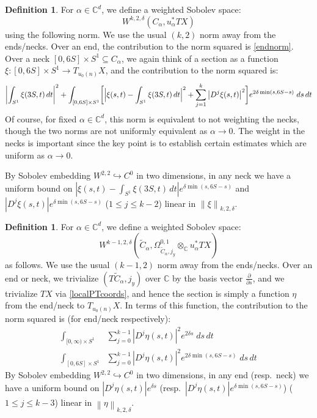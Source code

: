 \documentclass[12pt]{article}
\theoremstyle{definition}
\newtheorem{definition}[theorem]{Definition}
\theoremstyle{remark}
\numberwithin{equation}{subsection}
\newcommand{\CC}{\mathbb C}
\begin{document}
\begin{definition}
For $\alpha\in\CC^d$, we define a weighted Sobolev space:
\begin{equation}
W^{k,2,\delta}(C_\alpha,u_\alpha^\ast TX)
\end{equation}
using the following norm.  We use the usual $(k,2)$ norm away from the ends/necks.  Over an end, the contribution to the norm squared is \eqref{endnorm}.  Over a neck $[0,6S]\times S^1\subseteq C_\alpha$, we again think of a section as a function $\xi:[0,6S]\times S^1\to T_{u_0(n)}X$, and the contribution to the norm squared is:
\begin{equation*}
\biggl|\int_{S^1}\xi(3S,t)\,dt\biggr|^2+\int_{[0,6S]\times S^1}\biggl[\Bigl|\xi(s,t)-\int_{S^1}\xi(3S,t)\,dt\Bigr|^2+\sum_{j=1}^k\left|D^j\xi(s,t)\right|^2\biggr]e^{2\delta\min(s,6S-s)}\;ds\,dt
\end{equation*}
Of course, for fixed $\alpha\in\CC^d$, this norm is equivalent to not weighting the necks, though the two norms are not uniformly equivalent as $\alpha\to 0$.  The weight in the necks is important since the key point is to establish certain estimates which are uniform as $\alpha\to 0$.

By Sobolev embedding $W^{2,2}\hookrightarrow C^0$ in two dimensions, in any neck we have a uniform bound on $\left|\xi(s,t)-\int_{S^1}\xi(3S,t)\,dt\right|e^{\delta\min(s,6S-s)}$ and $\left|D^j\xi(s,t)\right|e^{\delta\min(s,6S-s)}$ ($1\leq j\leq k-2$) linear in $\left\|\xi\right\|_{k,2,\delta}$.
\end{definition}

\begin{definition}
For $\alpha\in\CC^d$, we define a weighted Sobolev space:
\begin{equation}
W^{k-1,2,\delta}(\tilde C_\alpha,\Omega^{0,1}_{\tilde C_\alpha,j_y}\otimes_\CC u_\alpha^\ast TX)
\end{equation}
as follows.  We use the usual $(k-1,2)$ norm away from the ends/necks.  Over an end or neck, we trivialize $(T\tilde C_\alpha,j_y)$ over $\CC$ by the basis vector $\frac\partial{\partial s}$, and we trivialize $TX$ via \eqref{localPTcoords}, and hence the section is simply a function $\eta$ from the end/neck to $T_{u_0(n)}X$.  In terms of this function, the contribution to the norm squared is (for end/neck respectively):
\begin{align}
\int_{[0,\infty)\times S^1}&\sum_{j=0}^{k-1}\left|D^j\eta(s,t)\right|^2e^{2\delta s}\;ds\,dt\\
\int_{[0,6S]\times S^1}&\sum_{j=0}^{k-1}\left|D^j\eta(s,t)\right|^2e^{2\delta\min(s,6S-s)}\;ds\,dt
\end{align}
By Sobolev embedding $W^{2,2}\hookrightarrow C^0$ in two dimensions, in any end (resp.\ neck) we have a uniform bound on $\left|D^j\eta(s,t)\right|e^{\delta s}$ (resp.\ $\left|D^j\eta(s,t)\right|e^{\delta\min(s,6S-s)}$) ($1\leq j\leq k-3$) linear in $\left\|\eta\right\|_{k,2,\delta}$.
\end{definition}
\end{document}
